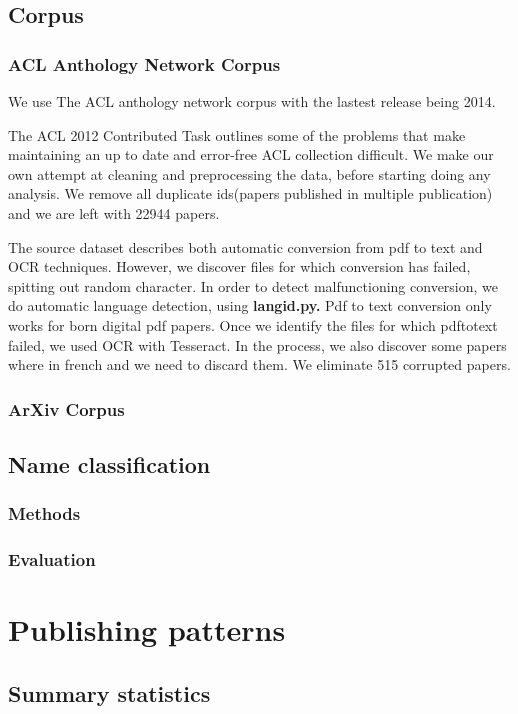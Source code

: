\documentclass[bsc,frontabs,twoside,singlespacing,parskip,deptreport]{infthesis}     %
\begin{document}
\section{Corpus}
\subsection{ACL Anthology Network Corpus}
We use The ACL anthology network corpus \cite{aan} with the lastest release being 2014. 

The  ACL 2012 Contributed Task \cite{contributed} outlines some of the problems that make maintaining an up to date and error-free ACL collection difficult. We make our own attempt at cleaning and preprocessing the data, before starting doing any analysis.
We remove all duplicate ids(papers published in multiple publication) and we are left with 22944 papers. 

The source dataset describes both automatic conversion from pdf to text and OCR techniques. However, we discover files for which conversion has failed, spitting out random character.
In order to detect malfunctioning conversion, we do automatic language detection, using \textbf{langid.py.} \cite{langid}
Pdf to text conversion only works for born digital pdf papers. Once we identify the files for which pdftotext failed, we used OCR with Tesseract. In the process, we also discover some papers where in french and we need to discard them. We eliminate 515 corrupted papers.
\subsection{ArXiv Corpus}

\section{Name classification}
\subsection{Methods}
\subsection{Evaluation}

\chapter{Publishing patterns}
\label{ch:publ}
\section{Summary statistics}
\end{document}
